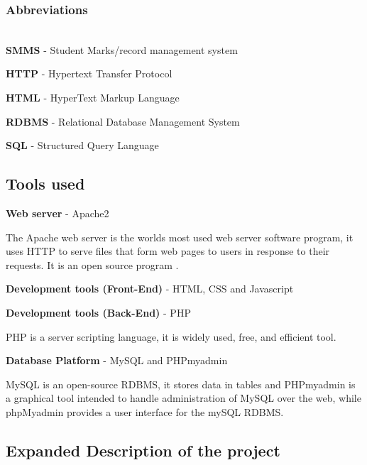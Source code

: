\documentclass[10pt,onecolumn]{MainDocument}
\begin{document}
\subsubsection{Abbreviations}~\\

\textbf{SMMS} - Student Marks/record management system

\textbf{HTTP} - Hypertext Transfer Protocol

\textbf{HTML} - HyperText Markup Language

\textbf{RDBMS} - Relational Database Management System

\textbf{SQL} - Structured Query Language

%
\subsection{Tools used}
\textbf{Web server} - Apache2

The Apache web server is the worlds most used web server software program, it uses HTTP to serve files that form web pages to users in response to their requests. It is an open source program \cite{ref5, ref6}. 

\textbf{Development tools (Front-End)} - HTML, CSS and Javascript

\textbf{Development tools (Back-End)} - PHP  

PHP is a server scripting language, it is widely used, free, and efficient tool.

\textbf{Database Platform} - MySQL and PHPmyadmin 

MySQL is an open-source RDBMS, it stores data in tables and PHPmyadmin is a graphical tool intended to handle administration of MySQL over the web, while phpMyadmin provides a user interface for the mySQL RDBMS.  

\subsection{Expanded Description of the project}
\end{document}
